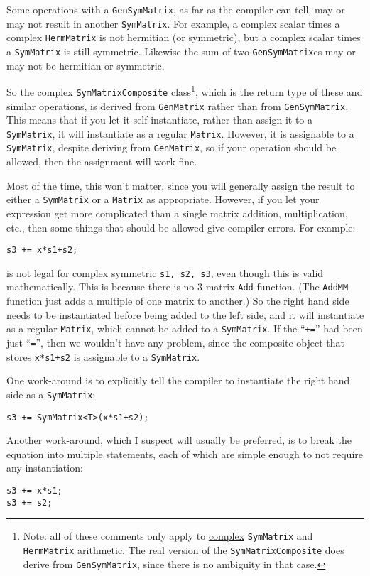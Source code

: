 \documentclass[twoside,letterpaper,11pt]{article}
\renewcommand{\tt}[1]{{\texttt {#1}}}
\begin{document}
Some operations with a \tt{GenSymMatrix}, as far as the compiler can tell, may or may
not result in another \tt{SymMatrix}.  For example, a complex scalar times a complex 
\tt{HermMatrix} is not hermitian (or symmetric), but a complex scalar times a \tt{SymMatrix}
is still symmetric.
Likewise the sum of two \tt{GenSymMatrix}es may or may not be hermitian or symmetric.

So the complex \tt{SymMatrixComposite} class\footnote{
Note: all of these comments only apply to \underline{complex} \tt{SymMatrix} and \tt{HermMatrix}
arithmetic.  The real version of the \tt{SymMatrixComposite} does derive from
\tt{GenSymMatrix}, since there is no ambiguity in that case.},
which is the return type of these and similar operations, 
is derived from \tt{GenMatrix}
rather than from \tt{GenSymMatrix}.  This means that if you let it
self-instantiate, rather than assign it to a \tt{SymMatrix}, it will 
instantiate as a regular \tt{Matrix}.  However, it is assignable to a \tt{SymMatrix},
despite deriving from \tt{GenMatrix},
so if your operation should be allowed, then the assignment will work fine.

Most of the time, this won't matter, since
you will generally assign the result to either a \tt{SymMatrix} or a \tt{Matrix}
as appropriate.  However, if you let your expression get more complicated than a single
matrix addition, multiplication, etc., then some things that should be allowed give compiler errors.
For example:
\begin{verbatim}
s3 += x*s1+s2;
\end{verbatim}
is not legal for complex symmetric \tt{s1, s2, s3}, even though this is valid mathematically.
This is because there is no 3-matrix 
\tt{Add} function.  (The \tt{AddMM} function just adds a multiple of one 
matrix to another.)  So the right hand side needs to be instantiated before
being added to the left side, and it will instantiate as a regular \tt{Matrix},
which cannot be added to a \tt{SymMatrix}.  
If the ``\tt{+=}'' had been just ``\tt{=}'', then we wouldn't have any problem,
since the composite object that stores \tt{x*s1+s2} is assignable to a \tt{SymMatrix}.

One work-around is to explicitly tell the compiler to instantiate the right hand
side as a \tt{SymMatrix}:
\begin{verbatim}
s3 += SymMatrix<T>(x*s1+s2);
\end{verbatim}

Another work-around, which I suspect will usually be preferred, is to break the 
equation into multiple statements, each of which are simple enough to not require
any instantiation:
\begin{verbatim}
s3 += x*s1;
s3 += s2;
\end{verbatim}
\end{document}
